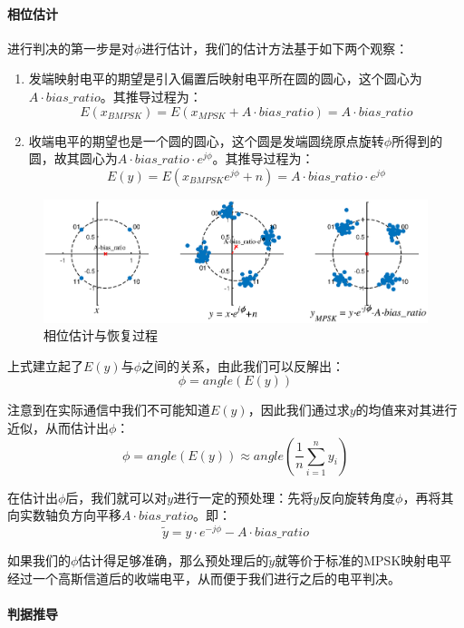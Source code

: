\paragraph{相位估计}
\indent

进行判决的第一步是对$\phi$进行估计，我们的估计方法基于如下两个观察：

\begin{enumerate}
    \item 发端映射电平的期望是引入偏置后映射电平所在圆的圆心，这个圆心为$A\cdot bias\_ratio$。其推导过程为：
    $$E(x_{BMPSK})=E(x_{MPSK}+A\cdot bias\_ratio)
    =A\cdot bias\_ratio$$
    \item 收端电平的期望也是一个圆的圆心，这个圆是发端圆绕原点旋转$\phi$所得到的圆，故其圆心为$A\cdot bias\_ratio\cdot e^{j\phi}$。其推导过程为：
    $$E(y)=E(x_{BMPSK}e^{j\phi}+n)=A\cdot bias\_ratio\cdot e^{j\phi}$$
\end{enumerate}

\begin{figure}[h]
    \centering
    \includegraphics[width=\textwidth]{pic/1-1-3.eps}
    \caption{相位估计与恢复过程}
\end{figure}

上式建立起了$E(y)$与$\phi$之间的关系，由此我们可以反解出：
$$\phi=angle(E(y))$$

注意到在实际通信中我们不可能知道$E(y)$，因此我们通过求$y$的均值来对其进行近似，从而估计出$\phi$：
$$\phi=angle(E(y))\approx angle(\frac{1}{n}\sum_{i=1}^ny_i)$$

在估计出$\phi$后，我们就可以对$y$进行一定的预处理：先将$y$反向旋转角度$\phi$，再将其向实数轴负方向平移$A\cdot bias\_ratio$。即：
$$\tilde{y}=y\cdot e^{-j\phi}-A\cdot bias\_ratio$$

如果我们的$\phi$估计得足够准确，那么预处理后的$\tilde{y}$就等价于标准的MPSK映射电平经过一个高斯信道后的收端电平，从而便于我们进行之后的电平判决。

\paragraph{判据推导}
\indent

